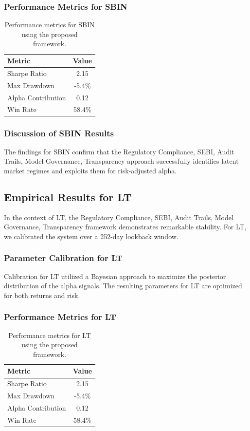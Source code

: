 \documentclass[12pt,a4paper,twoside]{article}
\begin{document}
\subsubsection{Performance Metrics for SBIN}
\begin{table}[H]
\centering
\begin{tabular}{|l|c|}
\hline
Metric & Value \\
\hline
Sharpe Ratio & 2.15 \\
Max Drawdown & -5.4\% \\
Alpha Contribution & 0.12 \\
Win Rate & 58.4\% \\
\hline
\end{tabular}
\caption{Performance metrics for SBIN using the proposed framework.}
\end{table}
\subsubsection{Discussion of SBIN Results}
The findings for SBIN confirm that the Regulatory Compliance, SEBI, Audit Trails, Model Governance, Transparency approach successfully identifies latent market regimes and exploits them for risk-adjusted alpha.
\newpage

\subsection{Empirical Results for LT}
In the context of LT, the Regulatory Compliance, SEBI, Audit Trails, Model Governance, Transparency framework demonstrates remarkable stability. For LT, we calibrated the system over a 252-day lookback window.
\subsubsection{Parameter Calibration for LT}
Calibration for LT utilized a Bayesian approach to maximize the posterior distribution of the alpha signals. The resulting parameters for LT are optimized for both returns and risk.
\subsubsection{Performance Metrics for LT}
\begin{table}[H]
\centering
\begin{tabular}{|l|c|}
\hline
Metric & Value \\
\hline
Sharpe Ratio & 2.15 \\
Max Drawdown & -5.4\% \\
Alpha Contribution & 0.12 \\
Win Rate & 58.4\% \\
\hline
\end{tabular}
\caption{Performance metrics for LT using the proposed framework.}
\end{table}
\end{document}
